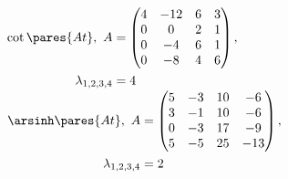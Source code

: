 \begin{multicols}{2}
\begin{enumtasks}
			\itemstar \( \begin{aligned} \cot \pares{At}, ~ A &= \begin{pmatrix} 4 & -12 & 6 & 3 \\ 0 & 0 & 2 & 1 \\ 0 & -4 & 6 & 1 \\ 0 & -8 & 4 & 6 \end{pmatrix}, \\ \lambda_{1, 2, 3, 4} &= 4 \end{aligned} \) %
			\itemdstar \( \begin{aligned} \arsinh \pares{At}, ~ A &= \begin{pmatrix} 5 & -3 & 10 & -6 \\ 3 & -1 & 10 & -6 \\ 0 & -3 & 17 & -9 \\ 5 & -5 & 25 & -13 \end{pmatrix}, \\ \lambda_{1, 2, 3, 4} &= 2 \end{aligned} \) %

		\end{enumtasks}
	\end{multicols}
